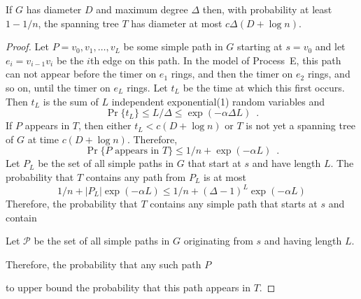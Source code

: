 \documentclass{patmorin}
\begin{document}
\begin{lem}
  If $G$ has diameter $D$ and maximum degree $\Delta$ then, with
  probability at least $1-1/n$, the spanning tree $T$ has diameter at
  most $c\Delta(D+\log n)$.
\end{lem}

\begin{proof}
  Let $P=v_0,v_1,\ldots,v_L$ be some simple path in $G$ starting at
  $s=v_0$ and let $e_i=v_{i-1}v_i$ be the $i$th edge on this path.
  In the model of Process~E, this path can not appear before the
  timer on $e_1$ rings, and then the timer on $e_2$ rings, and so on,
  until the timer on $e_L$ rings.  Let $t_L$ be the time at which this
  first occurs.  Then $t_L$ is the sum of $L$ independent exponential(1)
  random variables and
  \[
      \Pr\{t_L\} \le L/\Delta \le \exp(-\alpha \Delta L) \enspace .
  \]
  If $P$ appears in $T$, then either $t_L < c(D+\log n)$ or $T$ is not
  yet a spanning tree of $G$ at time $c(D+\log n)$.  
  Therefore, 
  \[
      \Pr\{\text{$P$ appears in $T$}\} \le 1/n + \exp(-\alpha L) \enspace .
  \]
  Let $P_L$ be the set of all simple paths in $G$ that start at $s$ and have length $L$.  The probability that $T$ contains any path from $P_L$ is at most
  \[
      1/n + |P_L|\exp(-\alpha L) \le 1/n + (\Delta-1)^L\exp(-\alpha L)
  \]
  Therefore, the probability that $T$ contains any simple path that
  starts at $s$ and contain 


Let $\mathcal{P}$ be
  the set of all simple paths in $G$ originating from $s$ and having length $L$.


Therefore, the probability
  that any such path $P$


  to upper bound the probability that this path appears in $T$.  
\end{proof}
\end{document}
